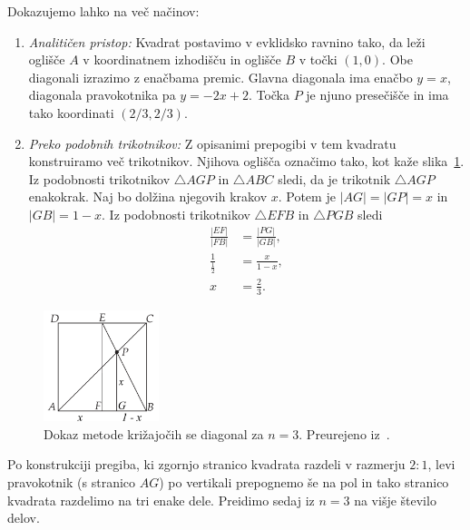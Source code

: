 \begin{dokaz}
    Dokazujemo lahko na več načinov:
    \begin{enumerate}
        \item \textit{Analitičen pristop:} Kvadrat postavimo v evklidsko ravnino tako, da leži oglišče $A$ v koordinatnem izhodišču in oglišče $B$ v točki $(1, 0)$. Obe diagonali izrazimo z enačbama premic. Glavna diagonala ima enačbo $y = x$, diagonala pravokotnika pa $y = -2x + 2$. Točka $P$ je njuno presečišče in ima tako koordinati $(2/3, 2/3)$.
        \item \textit{Preko podobnih trikotnikov:} Z opisanimi prepogibi v tem kvadratu konstruiramo več trikotnikov. Njihova oglišča označimo tako, kot kaže slika~\ref{fig:kriz_diag_3_dokaz}. Iz podobnosti trikotnikov $\triangle AGP$ in $\triangle ABC$ sledi, da je trikotnik $\triangle AGP$ enakokrak. Naj bo dolžina njegovih krakov $x$. Potem je $|AG| = |GP| = x$ in $|GB| = 1 - x$. Iz podobnosti trikotnikov $\triangle EFB$ in $\triangle PGB$ sledi
        \begin{align*}
            \frac{|EF|}{|FB|} &= \frac{|PG|}{|GB|}, \\
            \frac{1}{\frac{1}{2}} &= \frac{x}{1 - x}, \\
            x &= \frac{2}{3}.
        \end{align*}
    \end{enumerate}
\end{dokaz}
\begin{figure}[h]
    \centering
    \includegraphics[width=0.3\textwidth]{images/tretjinjenje_stranice2.png}
    \caption[Dokaz metode križajočih diagonal]{Dokaz metode križajočih se diagonal za $n=3$. Preurejeno iz~\cite[str. 38]{hull2013}.}
    \label{fig:kriz_diag_3_dokaz}
\end{figure}

Po konstrukciji pregiba, ki zgornjo stranico kvadrata razdeli v razmerju $2:1$, levi pravokotnik (s stranico $AG$) po vertikali prepognemo še na pol in tako stranico kvadrata razdelimo na tri enake dele. Preidimo sedaj iz $n = 3$ na višje število delov.

